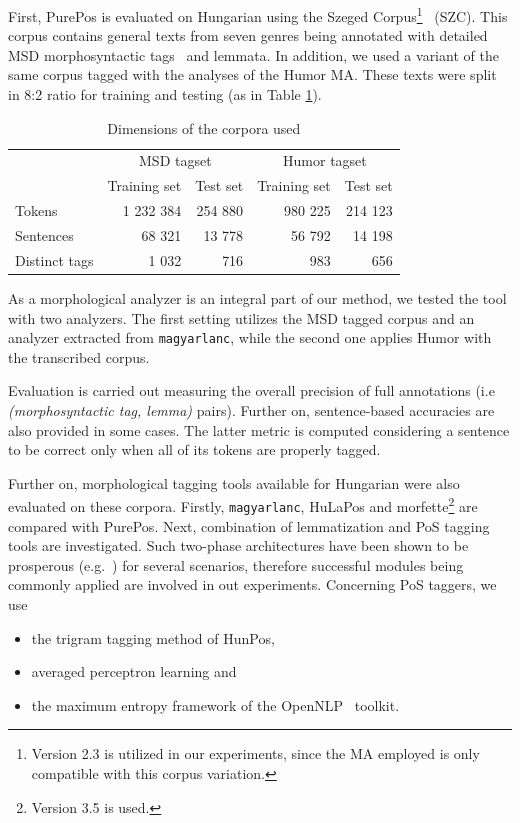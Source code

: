 First, PurePos is evaluated on Hungarian using the Szeged Corpus\footnote{Version 2.3 is utilized in our experiments, since the MA employed is only compatible with this corpus variation.}~\cite{Csendes2004} (SZC). 
This corpus contains general texts from seven genres being annotated with detailed MSD morphosyntactic tags~\cite{} and lemmata. %
In addition, we used a variant of the same corpus tagged with the analyses of the Humor MA. These texts were split in 8:2 ratio for training and testing (as in Table \ref{tab:szeged-corpus}). 

\begin{table}[ht]
\centering
\caption{Dimensions of the corpora used}
\begin{tabular}{l r r r r}
  \hline
  & \multicolumn{2}{c}{MSD tagset} & \multicolumn{2}{c}{Humor tagset} \\
  &  Training set &  Test set &  Training set &  Test set  \\
  \hline
  Tokens &  1 232 384 &  254 880 &  980 225 &  214 123 \\
  Sentences &  68 321 &  13 778 &  56 792 &  14 198 \\
  Distinct tags &  1 032 &  716 &  983 &  656 \\
  \hline
\end{tabular}
\label{tab:szeged-corpus}
\end{table}

As a morphological analyzer is an integral part of our method, we tested the tool with two analyzers. 
The first setting utilizes the MSD tagged corpus and an analyzer extracted from \texttt{magyarlanc}, while the second one applies Humor with the transcribed corpus.

Evaluation is carried out measuring the overall precision of full annotations (i.e \emph{(morphosyntactic tag, lemma)} pairs). 
Further on, sentence-based accuracies are also provided in some cases. 
The latter metric is computed considering a sentence to be correct only when all of its tokens are properly tagged. 

Further on, morphological tagging tools available for Hungarian were also evaluated on these corpora. 
Firstly, \texttt{magyarlanc}, HuLaPos and morfette\footnote{Version 3.5 is used.} are compared with PurePos.  
Next, combination of lemmatization and PoS tagging tools are investigated. 
Such two-phase architectures have been shown to be prosperous (e.g.~\cite{Agic2013,Erjavec2004}) for several scenarios, therefore successful modules being commonly applied are involved in out experiments. 
Concerning PoS taggers, we use
\begin{itemize}
  \item the trigram tagging method of HunPos,
  \item averaged perceptron learning and
  \item the maximum entropy framework of the OpenNLP~\cite{Baldridge2002} toolkit.
\end{itemize}

